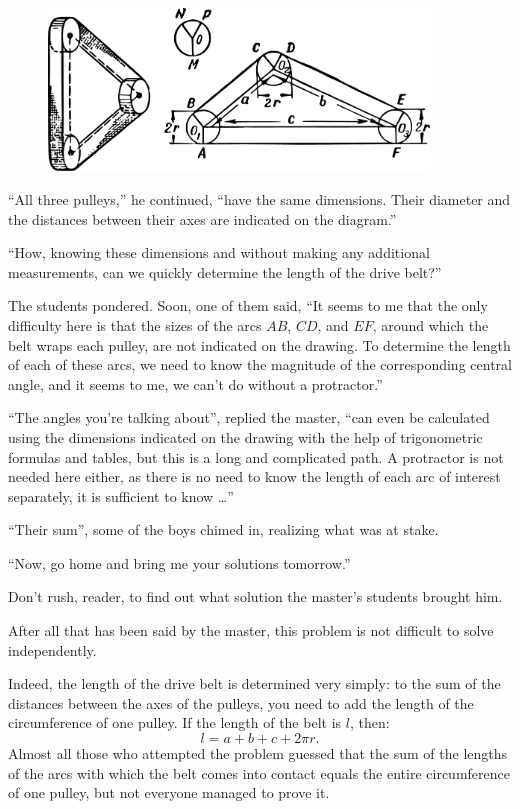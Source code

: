 \begin{figure}[h!]
\centering
\includegraphics[width=0.9\textwidth]{figures/ch-09/fig-139.pdf}
\end{figure}


``All three pulleys,'' he continued, ``have the same dimensions. Their diameter and the distances between their axes are indicated on the diagram.''

``How, knowing these dimensions and without making any additional measurements, can we quickly determine the length of the drive belt?''

The students pondered. Soon, one of them said, ``It seems to me that the only difficulty here is that the sizes of the arcs $AB$, $CD$, and $EF$, around which the belt wraps each pulley, are not indicated on the drawing. To determine the length of each of these arcs, we need to know the magnitude of the corresponding central angle, and it seems to me, we can't do without a protractor.''

``The angles you're talking about'', replied the master, ``can even be calculated using the dimensions indicated on the drawing with the help of trigonometric formulas and tables, but this is a long and complicated path. A protractor is not needed here either, as there is no need to know the length of each arc of interest separately, it is sufficient to know \dots{}''

``Their sum'', some of the boys chimed in, realizing what was at stake.

``Now, go home and bring me your solutions tomorrow.''

Don't rush, reader, to find out what solution the master's students brought him.

After all that has been said by the master, this problem is not difficult to solve independently.


\ans Indeed, the length of the drive belt is determined very simply: to the sum of the distances between the axes of the pulleys, you need to add the length of the circumference of one pulley. If the length of the belt is $ l $, then:
\begin{equation*}%
 l = a + b + c + 2\pi r.
\end{equation*}
Almost all those who attempted the problem guessed that the sum of the lengths of the arcs with which the belt comes into contact equals the entire circumference of one pulley, but not everyone managed to prove it.

